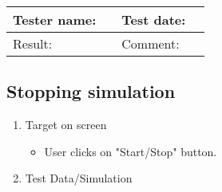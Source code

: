 \begin{tabularx}{\textwidth}{|p{3cm}X|p{3cm}X|}\hline
	Tester name: &  & Test date: & \\\hline
	Result: &   \pass & Comment: & \\\hline
\end{tabularx}

\newpage

\subsection{Stopping  simulation}

\begin{enumerate}

	\item Target on screen
	\begin{itemize}
		\item User clicks on "Start/Stop" button.
	\end{itemize}
	\item Test Data/Simulation
\end{enumerate}

